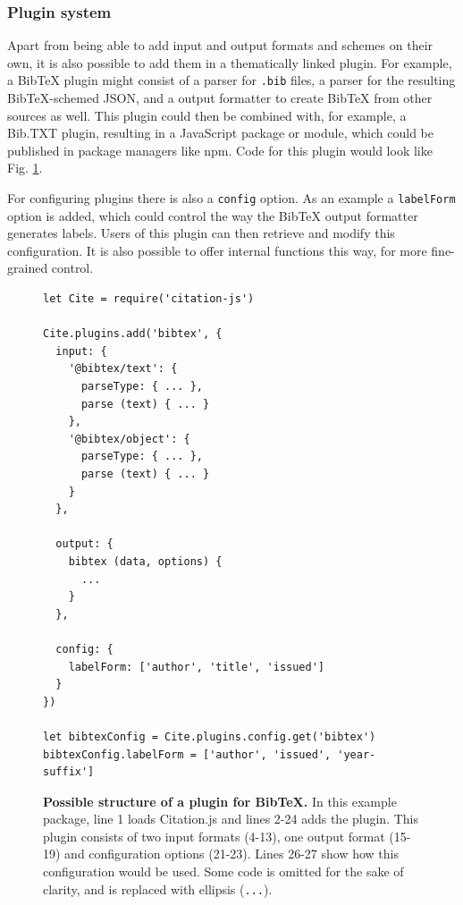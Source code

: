 \documentclass[fleqn,10pt,lineno]{wlpeerj} %
\begin{document}
\subsubsection*{Plugin system}

Apart from being able to add input and output formats and schemes on their own, it is also possible to add them in a thematically linked plugin. For example, a BibTeX plugin might consist of a parser for \texttt{.bib} files, a parser for the resulting BibTeX-schemed JSON, and a output formatter to create BibTeX from other sources as well. This plugin could then be combined with, for example, a Bib.TXT plugin, resulting in a JavaScript package or module, which could be published in package managers like npm. Code for this plugin would look like Fig. \ref{code:plugin}.

For configuring plugins there is also a \texttt{config} option. As an example a \texttt{labelForm} option is added, which could control the way the BibTeX output formatter generates labels. Users of this plugin can then retrieve and modify this configuration. It is also possible to offer internal functions this way, for more fine-grained control.

\begin{figure}[bt!]
\begin{small}
\centering
\begin{verbatim}
let Cite = require('citation-js')

Cite.plugins.add('bibtex', {
  input: {
    '@bibtex/text': {
      parseType: { ... },
      parse (text) { ... }
    },
    '@bibtex/object': {
      parseType: { ... },
      parse (text) { ... }
    }
  },

  output: {
    bibtex (data, options) {
      ...
    }
  },

  config: {
    labelForm: ['author', 'title', 'issued']
  }
})

let bibtexConfig = Cite.plugins.config.get('bibtex')
bibtexConfig.labelForm = ['author', 'issued', 'year-suffix']
\end{verbatim}
\end{small}
\caption{\textbf{Possible structure of a plugin for BibTeX.}
In this example package, line 1 loads Citation.js and lines 2-24 adds the plugin. This plugin consists of two input formats (4-13), one output format (15-19) and configuration options (21-23). Lines 26-27 show how this configuration would be used. Some code is omitted for the sake of clarity, and is replaced with ellipsis (\texttt{...}).
}
\label{code:plugin}
\end{figure}
\end{document}

